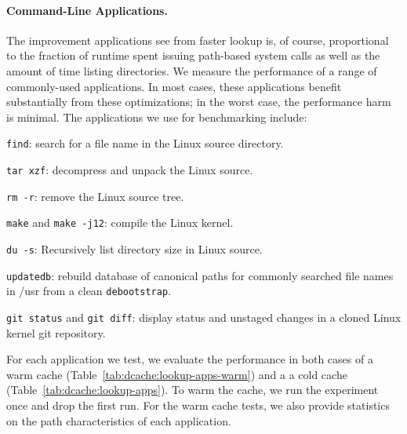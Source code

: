 \paragraph{Command-Line Applications.}
The improvement applications see from faster lookup is, of course, proportional 
to the fraction of runtime spent issuing path-based system calls as well as the amount of time
listing directories.
We measure the performance of a range of commonly-used applications.
In most cases, these applications benefit substantially from these optimizations;
in the worst case, the performance harm is minimal.
The applications we use for benchmarking include:
\begin{compactitem}
\item {\tt find}: search for a file name in the Linux source directory.
\item {\tt tar xzf}: decompress and unpack the Linux source.
\item {\tt rm -r}: remove the Linux source tree.
\item {\tt make} and {\tt make -j12}: compile the Linux kernel.
\item {\tt du -s}: Recursively list directory size in Linux source.
\item {\tt updatedb}: rebuild database of canonical paths for commonly searched file names in /usr from a clean {\tt debootstrap}.
\item {\tt git status} and {\tt git diff}: display status and unstaged changes in a cloned Linux kernel git repository.
\end{compactitem}
For each application we test, we evaluate the performance in both cases of 
a warm cache (Table~\ref{tab:dcache:lookup-apps-warm}) and a
a cold cache (Table~\ref{tab:dcache:lookup-apps}).
To warm the cache, we run the experiment once and drop the first run.
For the warm cache tests, we also provide statistics on the path characteristics of each application.


